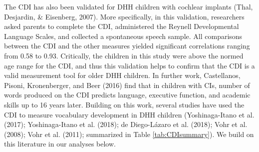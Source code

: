 \documentclass[english,man]{apa6}
\begin{document}
The CDI has also been validated for DHH children with cochlear implants (Thal, Desjardin, \& Eisenberg, 2007). More specifically, in this validation, researchers asked parents to complete the CDI, administered the Reynell Developmental Language Scales, and collected a spontaneous speech sample. All comparisons between the CDI and the other measures yielded significant correlations ranging from 0.58 to 0.93. Critically, the children in this study were above the normed age range for the CDI, and thus this validation helps to confirm that the CDI is a valid measurement tool for older DHH children. In further work, Castellanos, Pisoni, Kronenberger, and Beer (2016) find that in children with CIs, number of words produced on the CDI predicts language, executive function, and academic skills up to 16 years later. Building on this work, several studies have used the CDI to measure vocabulary development in DHH children (Yoshinaga-Itano et al. (2017); Yoshinaga-Itano et al. (2018); de Diego-Lázaro et al. (2018); Vohr et al. (2008); Vohr et al. (2011); summarized in Table \ref{tab:CDIsummary}). We build on this literature in our analyses below.

\begin{table}

\caption{\label{tab:CDIsummary}Summary of findings of CDI studies in DHH children}
\centering
{}
\end{table}
\end{document}
